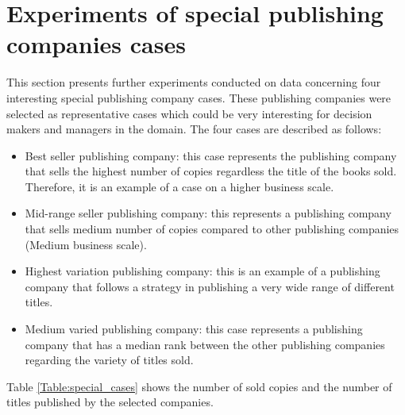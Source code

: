 \documentclass[a4paper,10pt,twocolumn,preprint,3p]{elsarticle}
\begin{document}

\section{Experiments of special publishing companies cases}
\label{sec:example_cases}

This section presents further experiments conducted on data concerning four 
interesting special publishing company cases. These publishing companies were 
selected as representative cases which could be very interesting for decision 
makers and managers in the domain. The four cases are described as follows:

\begin{itemize}
    \item Best seller publishing company: this case represents the publishing company that sells the highest number of copies regardless the title of the books sold. Therefore, it is an example of a case on a higher business scale.
    \item Mid-range seller publishing company: this represents a publishing company that sells medium number of copies compared to other publishing companies (Medium business scale). 
    \item Highest variation publishing company: this is an example of a publishing company that follows a strategy in publishing a very wide range of different titles.
    \item Medium varied publishing company: this case represents a publishing company that has a median rank between the other publishing companies regarding the variety of titles sold.
\end{itemize}


Table \ref{Table:special_cases} shows the number of sold copies and the number 
of titles published by the selected companies.

\begin{table*}
\caption{Description of publishing companies considered as special cases.}
\centering{}%
\label{Table:special_cases}
\end{table*}
\end{document}

